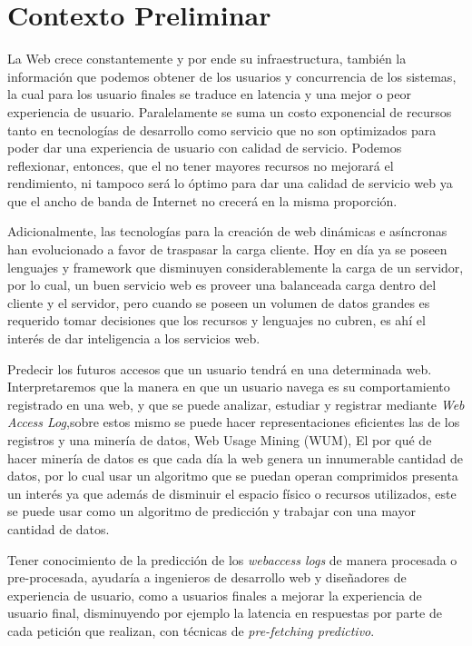 \section{Contexto Preliminar} 
\label{sec:preliminar}


  La Web crece constantemente y por ende su infraestructura, también la información que podemos obtener de los  usuarios y  concurrencia de los sistemas, la cual para los usuario finales se traduce en latencia y una mejor o peor experiencia de usuario. Paralelamente se suma un costo exponencial de recursos tanto en tecnologías de desarrollo como servicio que no son optimizados para poder dar una experiencia de usuario con calidad de servicio. Podemos reflexionar, entonces, que el no tener mayores recursos no mejorará el rendimiento, ni tampoco será lo óptimo para dar una calidad de servicio web ya que el ancho de banda de Internet no crecerá en la misma proporción.
   
  Adicionalmente, las tecnologías para la creación de web dinámicas e asíncronas han evolucionado a favor de traspasar la carga cliente.
  Hoy en día ya se poseen lenguajes y framework que disminuyen considerablemente la carga de un servidor, por lo cual, un buen servicio web es proveer una balanceada carga dentro del cliente y el servidor, pero cuando se poseen un volumen de datos grandes es requerido tomar decisiones que los recursos y lenguajes no cubren, es ahí el interés de dar inteligencia a los servicios web.

  Predecir los futuros accesos que un usuario tendrá en una determinada web. Interpretaremos que la manera en que un usuario navega es su comportamiento registrado en una web, y que se puede analizar, estudiar y registrar mediante \emph{Web Access Log},sobre estos mismo se puede hacer representaciones eficientes\cite{Claude2014} las de los registros y una minería de datos, Web Usage Mining (WUM), El por qué de hacer minería de datos es que cada día la web genera un innumerable cantidad de datos, por lo cual usar un algoritmo que se puedan operan comprimidos presenta un interés ya que además de disminuir el espacio físico o recursos utilizados, este se puede usar como un algoritmo de predicción y trabajar con una mayor cantidad de datos.
  
  Tener conocimiento de la predicción de los \emph{webaccess logs} de manera procesada o pre-procesada, ayudaría a ingenieros de desarrollo web y diseñadores de experiencia de usuario, como a  usuarios finales a mejorar la experiencia de usuario final, disminuyendo por ejemplo la latencia en respuestas por parte de cada petición que realizan, con técnicas de \emph{pre-fetching predictivo}.
  

